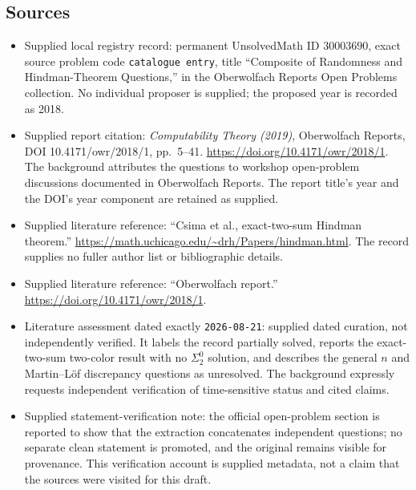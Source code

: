 \documentclass[11pt]{article}
\begin{document}
\subsection{Sources}
\begin{itemize}
\item Supplied local registry record: permanent UnsolvedMath ID \(30003690\), exact source problem code \texttt{catalogue entry}, title ``Composite of Randomness and Hindman-Theorem Questions,'' in the Oberwolfach Reports Open Problems collection. No individual proposer is supplied; the proposed year is recorded as 2018.
\item Supplied report citation: \emph{Computability Theory (2019)}, Oberwolfach Reports, DOI 10.4171/owr/2018/1, pp.\ 5--41. \url{https://doi.org/10.4171/owr/2018/1}. The background attributes the questions to workshop open-problem discussions documented in Oberwolfach Reports. The report title's year and the DOI's year component are retained as supplied.
\item Supplied literature reference: ``Csima et al., exact-two-sum Hindman theorem.'' \url{https://math.uchicago.edu/~drh/Papers/hindman.html}. The record supplies no fuller author list or bibliographic details.
\item Supplied literature reference: ``Oberwolfach report.'' \url{https://doi.org/10.4171/owr/2018/1}.
\item Literature assessment dated exactly \texttt{2026-08-21}: supplied dated curation, not independently verified. It labels the record partially solved, reports the exact-two-sum two-color result with no \(\Sigma^0_2\) solution, and describes the general \(n\) and Martin--L\"of discrepancy questions as unresolved. The background expressly requests independent verification of time-sensitive status and cited claims.
\item Supplied statement-verification note: the official open-problem section is reported to show that the extraction concatenates independent questions; no separate clean statement is promoted, and the original remains visible for provenance. This verification account is supplied metadata, not a claim that the sources were visited for this draft.
\end{itemize}
\end{document}

